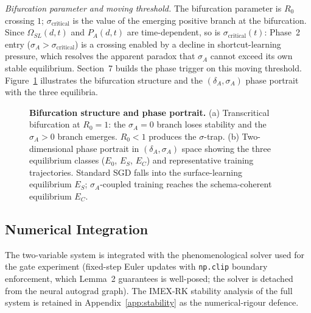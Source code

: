 \documentclass{article}
\providecommand{\Description}[1]{}
\theoremstyle{definition}
\begin{document}
\noindent\emph{Bifurcation parameter and moving threshold.} The
bifurcation parameter is $R_0$ crossing $1$; $\sigma_{\text{critical}}$
is the value of the emerging positive branch at the bifurcation. Since
$\Omega_{SL}(d,t)$ and $P_A(d,t)$ are time-dependent, so is
$\sigma_{\text{critical}}(t)$: Phase~2 entry ($\sigma_A >
\sigma_{\text{critical}}$) is a crossing enabled by a decline in
shortcut-learning pressure, which resolves the apparent paradox that
$\sigma_A$ cannot exceed its own stable equilibrium. Section~7 builds
the phase trigger on this moving threshold.
Figure~\ref{fig:bifurcation} illustrates the bifurcation structure and
the $(\delta_A, \sigma_A)$ phase portrait with the three equilibria.

\begin{figure}[htbp]
\centering
\resizebox{0.95\textwidth}{!}{}
\caption{\textbf{Bifurcation structure and phase portrait.}
(a) Transcritical bifurcation at $R_0 = 1$: the $\sigma_A = 0$ branch
loses stability and the $\sigma_A > 0$ branch emerges. $R_0 < 1$
produces the $\sigma$-trap. (b) Two-dimensional phase portrait in
$(\delta_A, \sigma_A)$ space showing the three equilibrium classes
($E_0$, $E_S$, $E_C$) and representative training trajectories.
Standard SGD falls into the surface-learning equilibrium $E_S$;
$\sigma_A$-coupled training reaches the schema-coherent equilibrium
$E_C$.}
\Description{Two-panel figure. Panel (a): Bifurcation diagram showing sigma_A vs R_0. A solid line shows stable sigma=0 branch for R_0<1, which becomes dashed (unstable) after R_0=1. A stable positive-sigma branch emerges after the transcritical bifurcation point. Panel (b): 2D phase portrait in delta_A-sigma_A space with three equilibria marked (E_0 origin, E_S surface-learning trap at high delta/low sigma, E_C target at high delta/high sigma), delta and sigma nullclines, and two representative trajectories (SGD falls to E_S, sigma-coupled reaches E_C).}
\label{fig:bifurcation}
\end{figure}

\subsection{Numerical Integration}\label{sec:numerical-protocol}

The two-variable system is integrated with the phenomenological solver
used for the gate experiment (fixed-step Euler updates with
\texttt{np.clip} boundary enforcement, which Lemma~2 guarantees is
well-posed; the solver is detached from the neural autograd graph). The
IMEX-RK stability analysis of the full system is retained in
Appendix~\ref{app:stability} as the numerical-rigour defence.
\end{document}
